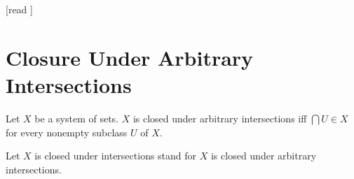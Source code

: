 \documentclass[10pt]{article}
\begin{document}
  \begin{imports}
    \begin{forthel}
      [read ]
    \end{forthel}
  \end{imports}


  \section*{Closure Under Arbitrary Intersections}

  \begin{forthel}
    \begin{definition}[id=FOUNDATIONS_14_2369621166391296,printid]
      Let $X$ be a system of sets.
      $X$ is closed under arbitrary intersections iff $\bigcap U \in X$ for every nonempty subclass $U$ of $X$.
    \end{definition}

    Let $X$ is closed under intersections stand for $X$ is closed under arbitrary intersections.
  \end{forthel}
\end{document}
